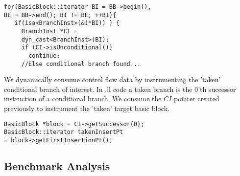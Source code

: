 \begin{frame}[fragile]
\begin{lstlisting}
for(BasicBlock::iterator BI = BB->begin(),
BE = BB->end(); BI != BE; ++BI){
   if(isa<BranchInst>(&(*BI)) ) {
     BranchInst *CI = 
     dyn_cast<BranchInst>(BI);
     if (CI->isUnconditional())
       continue; 
     //Else conditional branch found...
\end{lstlisting}
\end{frame}

We dynamically consume control flow data by instrumenting the 'taken' conditional branch of interest. In .ll code a taken branch is the 0'th successor instruction of a conditional branch. We consume the $CI$ pointer created previously to instrument the 'taken' target basic block.\\

\begin{frame}[fragile]
\begin{lstlisting}
BasicBlock *block = CI->getSuccessor(0);
BasicBlock::iterator takenInsertPt
= block->getFirstInsertionPt();
\end{lstlisting}
\end{frame}
  

\subsection{Benchmark Analysis}
